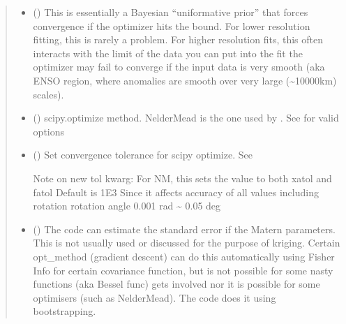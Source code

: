 \documentclass[letterpaper,10pt,english]{sphinxmanual}
\begin{document}
\begin{fulllineitems}
\begin{fulllineitems}
\begin{quote}
\begin{description}
\begin{itemize}
\item {}
\sphinxAtStartPar
{} () \textendash{} This is essentially a Bayesian “uniformative prior”
that forces convergence if the optimizer hits the bound.
For lower resolution fitting, this is rarely a problem.
For higher resolution fits, this often interacts with
the limit of the data you can put into the fit the optimizer
may fail to converge if the input data is very smooth (aka ENSO
region, where anomalies are smooth over very large (\textasciitilde{}10000km)
scales).

\item {}
\sphinxAtStartPar
{} () \textendash{} scipy.optimize method. Nelder\sphinxhyphen{}Mead is the one used by .
See 
for valid options

\item {}
\sphinxAtStartPar
{} () \textendash{}
\sphinxAtStartPar
Set convergence tolerance for scipy optimize.
See 

\sphinxAtStartPar
Note on new tol kwarg:
For N\sphinxhyphen{}M, this sets the value to both xatol and fatol
Default is 1E\sphinxhyphen{}3
Since it affects accuracy of all values including rotation
rotation angle 0.001 rad \textasciitilde{} 0.05 deg


\item {}
\sphinxAtStartPar
{} (\sphinxstyleliteralemphasis{\sphinxupquote{ | }}) \textendash{} The code can estimate the standard error if the Matern parameters.
This is not usually used or discussed for the purpose of kriging.
Certain opt\_method (gradient descent) can do this automatically
using Fisher Info for certain covariance function,
but is not possible for some nasty functions (aka Bessel
func) gets involved nor it is possible for some optimisers
(such as Nelder\sphinxhyphen{}Mead).
The code does it using bootstrapping.


\end{itemize}
\end{description}
\end{quote}
\end{fulllineitems}
\end{fulllineitems}
\end{document}
